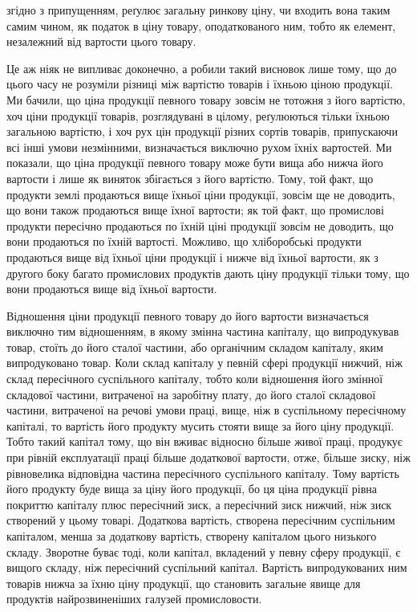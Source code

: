 \parcont{}  %
згідно з припущенням, реґулює загальну ринкову ціну, чи входить вона таким самим чином, як податок в
ціну товару, оподаткованого ним, тобто як елемент, незалежний від вартости цього товару.

Це аж ніяк не випливає доконечно, а робили такий висновок лише тому,
що до цього часу не розуміли різниці між вартістю товарів і їхньою ціною
продукції. Ми бачили, що ціна продукції певного товару зовсім не тотожня
з його вартістю, хоч ціни продукції товарів, розглядувані в цілому, реґулюються
тільки їхньою загальною вартістю, і хоч рух цін продукції різних сортів
товарів, припускаючи всі інші умови незмінними, визначається виключно
рухом їхніх вартостей. Ми показали, що ціна продукції певного товару може
бути вища або нижча його вартости і лише як виняток збігається з його вартістю.
Тому, той факт, що продукти землі продаються вище їхньої ціни продукції,
зовсім ще не доводить, що вони також продаються вище їхної вартости; як той факт, що промислові
продукти пересічно продаються по їхній ціні продукції зовсім не доводить, що вони продаються по
їхній вартості. Можливо, що хліборобські продукти продаються вище від їхньої ціни продукції і нижче
від їхньої вартости, як з другого боку багато промислових продуктів дають ціну продукції тільки
тому, що вони продаються вище від їхньої вартости.

Відношення ціни продукції певного товару до його вартости визначається
виключно тим відношенням, в якому змінна частина капіталу, що випродукував товар, стоїть до його
сталої частини, або органічним складом капіталу, яким випродуковано товар. Коли склад капіталу у
певній сфері продукції нижчий, ніж склад пересічного суспільного капіталу, тобто коли відношення
його змінної складової частини, витраченої на заробітну плату, до його сталої складової частини,
витраченої на речові умови праці, вище, ніж в суспільному пересічному капіталі, то вартість його
продукту мусить стояти вище за його ціну продукції. Тобто такий капітал тому, що він вживає відносно
більше живої праці, продукує при рівній експлуатації праці більше додаткової вартости, отже, більше
зиску, ніж рівновелика відповідна частина пересічного суспільного капіталу. Тому вартість його
продукту буде вища за ціну його продукції, бо ця ціна продукції рівна покриттю капіталу плюс
пересічний зиск, а пересічний зиск нижчий, ніж зиск створений у цьому товарі. Додаткова вартість,
створена пересічним суспільним капіталом, менша за додаткову вартість, створену капіталом цього
низького складу. Зворотне буває тоді, коли капітал, вкладений у певну сферу продукції, є вищого
складу, ніж пересічний суспільний капітал. Вартість випродукованих ним товарів нижча за їхню ціну
продукції, що становить загальне явище для продуктів найрозвиненіших галузей промисловости.

